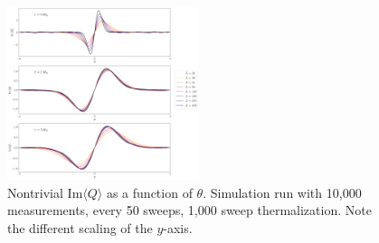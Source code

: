 \documentclass[a4paper,11pt]{article}
\begin{document}
\begin{figure}[h]
    \centering
    \includegraphics[width=0.5\textwidth]{theta.png}
    \caption{\label{fig:theta} Nontrivial $\mathrm{Im}\langle Q \rangle$ as a function of $\theta$. Simulation run with 10,000 measurements, every 50 sweeps, 1,000 sweep thermalization. Note the different scaling of the $y$-axis.}
  \end{figure}




\end{document}
